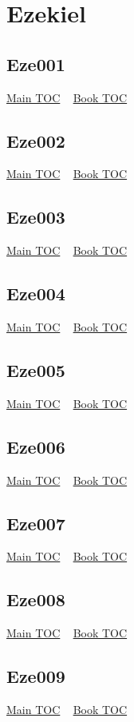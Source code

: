 \documentclass{book}
\begin{document}
  \chapter{Ezekiel} \label{subsec:Eze} \begin{multicols}{2} \minitoc \end{multicols}
  \section{Eze001}\hyperlink{toc}{Main TOC} ~ \hyperref[subsec:Eze]{Book TOC} 
  \section{Eze002}\hyperlink{toc}{Main TOC} ~ \hyperref[subsec:Eze]{Book TOC} 
  \section{Eze003}\hyperlink{toc}{Main TOC} ~ \hyperref[subsec:Eze]{Book TOC} 
  \section{Eze004}\hyperlink{toc}{Main TOC} ~ \hyperref[subsec:Eze]{Book TOC} 
  \section{Eze005}\hyperlink{toc}{Main TOC} ~ \hyperref[subsec:Eze]{Book TOC} 
  \section{Eze006}\hyperlink{toc}{Main TOC} ~ \hyperref[subsec:Eze]{Book TOC} 
  \section{Eze007}\hyperlink{toc}{Main TOC} ~ \hyperref[subsec:Eze]{Book TOC} 
  \section{Eze008}\hyperlink{toc}{Main TOC} ~ \hyperref[subsec:Eze]{Book TOC} 
  \section{Eze009}\hyperlink{toc}{Main TOC} ~ \hyperref[subsec:Eze]{Book TOC} 
\end{document}
